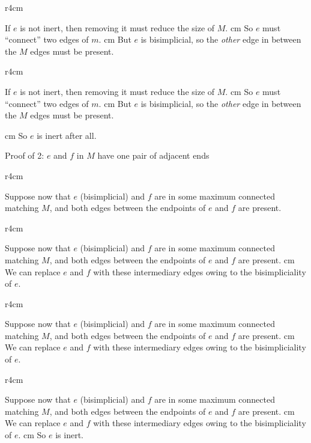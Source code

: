 \documentclass{beamer}
\newcommand{\bframe}[2]{\begin{frame}{#1}#2\end{frame}}
\begin{document}
{\begin{overprint}
\begin{wrapfigure}{r}{4cm}
			
			\end{wrapfigure}
			If $e$ is not inert, then removing it must reduce the size of $M$.  cm
			So $e$ must ``connect'' two edges of $m$.  cm
			But $e$ is bisimplicial, so the {\it other} edge in between the $M$ edges must be present.
		\onslide<9->
			\begin{wrapfigure}{r}{4cm}\vspace{-20pt}\hspace{30pt}
			
			\end{wrapfigure}
			If $e$ is not inert, then removing it must reduce the size of $M$.  cm
			So $e$ must ``connect'' two edges of $m$.  cm
			But $e$ is bisimplicial, so the {\it other} edge in between the $M$ edges must be present.
\end{overprint}
\pause\pause\pause\pause\pause\pause\pause {} cm So $e$ is inert after all.
}

\bframe{Proof of 2: $e$ and $f$ in $M$ have one pair of adjacent ends}{

\begin{overprint}
		\onslide<1>
			\begin{wrapfigure}{r}{4cm}\vspace{-20pt}\hspace{30pt}
			
			\end{wrapfigure}
			 Suppose now that $e$ (bisimplicial) and $f$ are in some maximum connected matching $M$, and both edges between the endpoints of $e$ and $f$ are present.
		\onslide<2>
			\begin{wrapfigure}{r}{4cm}\vspace{-20pt}\hspace{30pt}
			
			\end{wrapfigure}
			Suppose now that $e$ (bisimplicial) and $f$ are in some maximum connected matching $M$, and both edges between the endpoints of $e$ and $f$ are present. \vskip 0.5 cm
We can replace $e$ and $f$ with these intermediary edges owing to the bisimpliciality of $e$.  
		\onslide<3>
			\begin{wrapfigure}{r}{4cm}\vspace{-20pt}\hspace{30pt}
			
			\end{wrapfigure}
			Suppose now that $e$ (bisimplicial) and $f$ are in some maximum connected matching $M$, and both edges between the endpoints of $e$ and $f$ are present. \vskip 0.5 cm
We can replace $e$ and $f$ with these intermediary edges owing to the bisimpliciality of $e$.
		\onslide<4>
			\begin{wrapfigure}{r}{4cm}\vspace{-20pt}\hspace{30pt}
			
			\end{wrapfigure}
			Suppose now that $e$ (bisimplicial) and $f$ are in some maximum connected matching $M$, and both edges between the endpoints of $e$ and $f$ are present. \vskip 0.5 cm
We can replace $e$ and $f$ with these intermediary edges owing to the bisimpliciality of $e$. 	\vskip 0.5 cm So $e$ is inert.
\end{overprint}
}
\end{document}

